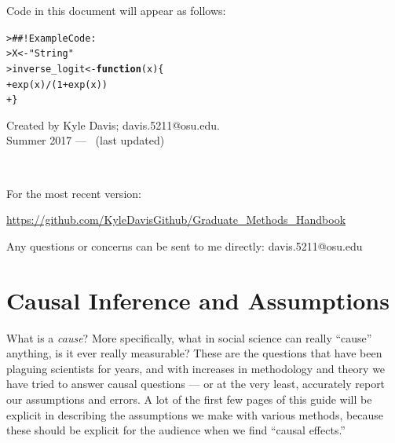 \documentclass[12pt]{article}\usepackage[]{graphicx}\usepackage[]{color}
\makeatletter
\newcommand{\hlnum}[1]{\textcolor[rgb]{0.82,0.78,0.62}{#1}}%
\newcommand{\hlstr}[1]{\textcolor[rgb]{0.82,0.78,0.62}{#1}}%
\newcommand{\hlcom}[1]{\textcolor[rgb]{0.404,0.408,0.42}{#1}}%
\newcommand{\hlopt}[1]{\textcolor[rgb]{0.882,0.878,0.898}{#1}}%
\newcommand{\hlstd}[1]{\textcolor[rgb]{0.882,0.878,0.898}{#1}}%
\newcommand{\hlkwa}[1]{\textcolor[rgb]{0.384,0.675,0.808}{\textbf{#1}}}%
\newcommand{\hlkwb}[1]{\textcolor[rgb]{0.902,0.675,0.196}{#1}}%
\newcommand{\hlkwc}[1]{\textcolor[rgb]{0.812,0.522,0.388}{#1}}%
\newcommand{\hlkwd}[1]{\textcolor[rgb]{0.733,0.388,0.812}{#1}}%
\newenvironment{kframe}{%
 \def\at@end@of@kframe{}%
 \ifinner\ifhmode%
  \def\at@end@of@kframe{\end{minipage}}%
  \begin{minipage}{\columnwidth}%
 \fi\fi%
 \def\FrameCommand##1{\hskip\@totalleftmargin \hskip-\fboxsep
 \colorbox{shadecolor}{##1}\hskip-\fboxsep
     \hskip-\linewidth \hskip-\@totalleftmargin \hskip\columnwidth}%
 \MakeFramed {\advance\hsize-\width
   \@totalleftmargin\z@ \linewidth\hsize
   \@setminipage}}%
 {\par\unskip\endMakeFramed%
 \at@end@of@kframe}
\newenvironment{knitrout}{}{} %
\makeatother
\begin{document}
\begin{flushleft}
Code in this document will appear as follows:




\begin{knitrout}
\color{fgcolor}\begin{kframe}
\begin{alltt}
\hlstd{> }\hlcom{##!  Example Code:}
\hlstd{> }\hlstd{X} \hlkwb{<-} \hlstr{"String"}
\hlstd{> }\hlstd{inverse_logit} \hlkwb{<-} \hlkwa{function}\hlstd{(}\hlkwc{x}\hlstd{)\{}
\hlstd{+ }     \hlkwd{exp}\hlstd{(x)}\hlopt{/}\hlstd{(}\hlnum{1}\hlopt{+}\hlkwd{exp}\hlstd{(x))}
\hlstd{+ }\hlstd{\}}
\end{alltt}
\end{kframe}
\end{knitrout}


\begin{center}
Created by Kyle Davis; davis.5211@osu.edu.\\ Summer 2017 --- \thedate ~(last updated)

\

For the most recent version:

\begin{center}
\url{https://github.com/KyleDavisGithub/Graduate_Methods_Handbook}
\end{center}

Any questions or concerns can be sent to me directly: davis.5211@osu.edu
\end{center}




\clearpage
\thispagestyle{empty}


\clearpage
\tableofcontents
\thispagestyle{empty}


\clearpage
\setcounter{page}{1}

\section{Causal Inference and Assumptions}

What is a \textit{cause}? More specifically, what in social science can really ``cause'' anything, is it ever really measurable? These are the questions that have been plaguing scientists for years, and with increases in methodology and theory we have tried to answer causal questions --- or at the very least, accurately report our assumptions and errors. A lot of the first few pages of this guide will be explicit in describing the assumptions we make with various methods, because these should be explicit for the audience when we find ``causal effects.''


\end{flushleft}
\end{document}
